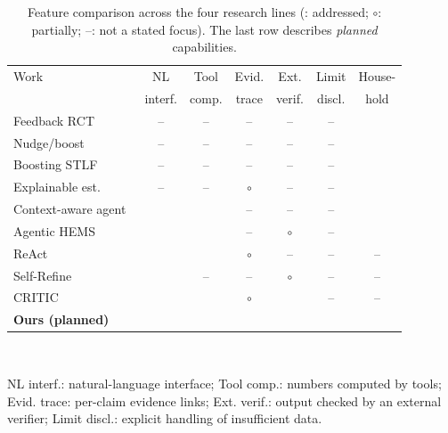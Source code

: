 \documentclass[conference]{IEEEtran}
\newcommand{\yes}{\checkmark}
\newcommand{\part}{$\circ$}
\newcommand{\no}{--}
\begin{document}
\begin{table}[t]
\centering
\caption{Feature comparison across the four research lines
(\yes: addressed; \part: partially; \no: not a stated focus).
The last row describes \emph{planned} capabilities.}
\label{tab:matrix}
\setlength{\tabcolsep}{3pt}
\footnotesize
\begin{tabular}{@{}lcccccc@{}}
\toprule
Work & NL & Tool & Evid. & Ext. & Limit & House-\\
     & interf. & comp. & trace & verif. & discl. & hold \\
\midrule
Feedback RCT~\cite{boomsma2025feedback}   & \no & \no & \no & \no & \no & \yes \\
Nudge/boost~\cite{paunov2026nudges}       & \no & \no & \no & \no & \no & \yes \\
Boosting STLF~\cite{muqtadir2025nowcasting} & \no & \no & \no & \no & \no & \yes \\
Explainable est.~\cite{beraud2024explainable} & \no & \no & \part & \no & \no & \yes \\
Context-aware agent~\cite{he2025contextaware} & \yes & \yes & \no & \no & \no & \yes \\
Agentic HEMS~\cite{jonah2026agentic}      & \yes & \yes & \no & \part & \no & \yes \\
ReAct~\cite{yao2023react}                 & \yes & \yes & \part & \no & \no & \no \\
Self-Refine~\cite{madaan2023selfrefine}   & \yes & \no & \no & \part & \no & \no \\
CRITIC~\cite{gou2024critic}               & \yes & \yes & \part & \yes & \no & \no \\
\midrule
\textbf{Ours (planned)}                   & \yes & \yes & \yes & \yes & \yes & \yes \\
\bottomrule
\end{tabular}
\\[2pt]
\raggedright\scriptsize
NL interf.: natural-language interface; Tool comp.: numbers computed by
tools; Evid. trace: per-claim evidence links; Ext. verif.: output
checked by an external verifier; Limit discl.: explicit handling of
insufficient data. %
\end{table}
\end{document}
